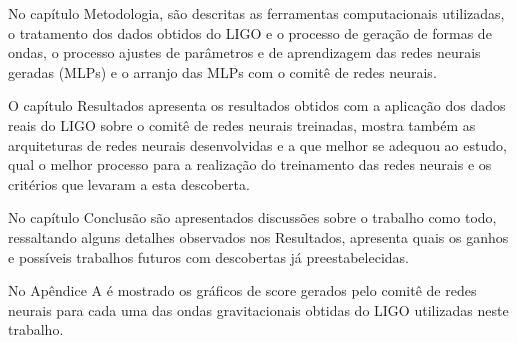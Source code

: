 No capítulo Metodologia, são descritas as ferramentas computacionais utilizadas, o tratamento dos dados obtidos do LIGO e o processo de geração de formas de ondas, o processo ajustes de parâmetros e de aprendizagem das redes neurais geradas (MLPs) e o arranjo das MLPs com o comitê de redes neurais.

O capítulo Resultados apresenta os resultados obtidos com a aplicação dos dados reais do LIGO sobre o comitê de redes neurais treinadas, mostra também as arquiteturas de redes neurais desenvolvidas e a que melhor se adequou ao estudo, qual o melhor processo para a realização do treinamento das redes neurais e os critérios que levaram a esta descoberta.

No capítulo Conclusão são apresentados discussões sobre o trabalho como todo, ressaltando alguns detalhes observados nos Resultados, apresenta quais os ganhos e possíveis trabalhos futuros com descobertas já preestabelecidas.

No Apêndice A é mostrado os gráficos de score gerados pelo comitê de redes neurais para cada uma das ondas gravitacionais obtidas do LIGO utilizadas neste trabalho.